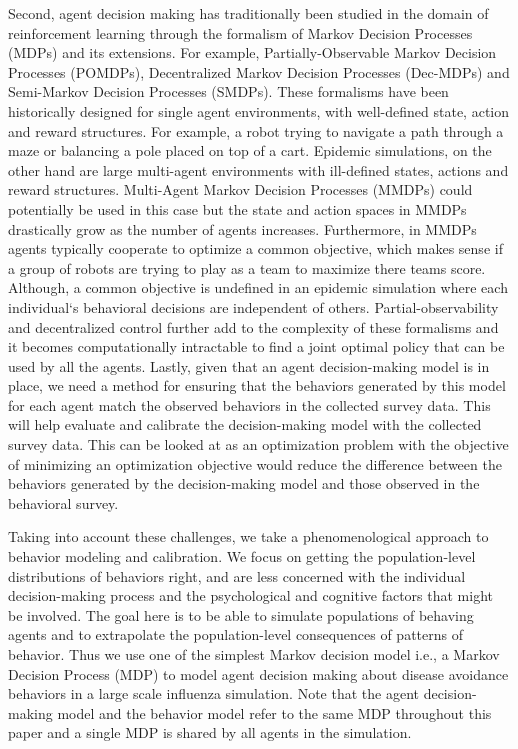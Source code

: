 \documentclass[doublespace,draft]{VTthesis}
\begin{document}
    Second, agent decision making has traditionally been studied in the domain of reinforcement learning through the formalism of Markov Decision Processes (MDPs) and its extensions. For example, Partially-Observable Markov Decision Processes (POMDPs), Decentralized Markov Decision Processes (Dec-MDPs) and Semi-Markov Decision Processes (SMDPs). These formalisms have been historically designed for single agent environments, with well-defined state, action and reward structures. For example, a robot trying to navigate a path through a maze or balancing a pole placed on top of a cart. Epidemic simulations, on the other hand are large multi-agent environments with ill-defined states, actions and reward structures. Multi-Agent Markov Decision Processes (MMDPs) could potentially be used in this case but the state and action spaces in MMDPs drastically grow as the number of agents increases. Furthermore, in MMDPs agents typically cooperate to optimize a common objective, which makes sense if a group of robots are trying to play as a team to maximize there teams score. Although, a common objective is undefined in an epidemic simulation where each individual`s behavioral decisions are independent of others. Partial-observability and decentralized control further add to the complexity of these formalisms and it becomes computationally intractable to find a joint optimal policy that can be used by all the agents. 
    Lastly, given that an agent decision-making model is in place, we need a method for ensuring that the behaviors generated by this model for each agent match the observed behaviors in the collected survey data. This will help evaluate and calibrate the decision-making model with the collected survey data. This can be looked at as an optimization problem with the objective of minimizing an optimization objective would reduce the difference between the behaviors generated by the decision-making model and those observed in the behavioral survey. 
    
    Taking into account these challenges, we take a phenomenological approach to behavior modeling and calibration. We focus on getting the population-level distributions of behaviors right, and are less concerned with the individual decision-making process and the psychological and cognitive factors that might be involved. The goal here is to be able to simulate populations of behaving agents and to extrapolate the population-level consequences of patterns of behavior. Thus we use one of the simplest Markov decision model i.e., a Markov Decision Process (MDP) to model agent decision making about disease avoidance behaviors in a large scale influenza simulation. Note that the agent decision-making model and the behavior model refer to the same MDP throughout this paper and a single MDP is shared by all agents in the simulation.
    
\end{document}
